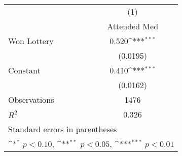{
\def\sym#1{\ifmmode^{#1}\else\(^{#1}\)\fi}
\begin{tabular}{l*{1}{c}}
\hline\hline
                    &\multicolumn{1}{c}{(1)}\\
                    &\multicolumn{1}{c}{Attended Med}\\
\hline
Won Lottery         &       0.520\sym{***}\\
                    &    (0.0195)         \\
[1em]
Constant            &       0.410\sym{***}\\
                    &    (0.0162)         \\
\hline
Observations        &        1476         \\
\(R^{2}\)           &       0.326         \\
\hline\hline
\multicolumn{2}{l}{\footnotesize Standard errors in parentheses}\\
\multicolumn{2}{l}{\footnotesize \sym{*} \(p<0.10\), \sym{**} \(p<0.05\), \sym{***} \(p<0.01\)}\\
\end{tabular}
}
